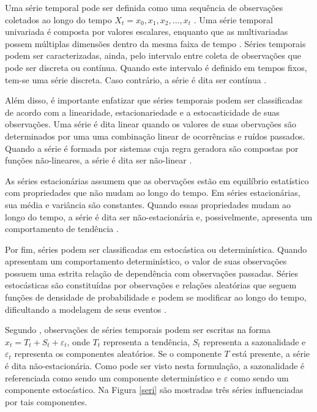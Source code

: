 Uma série temporal pode ser definida como uma sequência de observações coletados ao longo do tempo $X_{t}={x_{0},x_{1},x_{2},...,x_{t}}$ \cite{box2015,Chouakria2007,morettin2006}. Uma série temporal univariada é composta por valores escalares, enquanto que as multivariadas possem múltiplas dimensões dentro da mesma faixa de tempo \cite{box2015,Chouakria2007}. Séries temporais podem ser caracterizadas, ainda, pelo intervalo entre coleta de observações que pode ser discreta ou contínua. Quando este intervalo é definido em tempos fixos, tem-se uma série discreta. Caso contrário, a série é dita ser contínua \cite{box2015, morettin2006}.  

Além disso, é importante enfatizar que séries temporais podem ser classificadas de acordo com a linearidade, estacionariedade e a estocasticidade de suas observações. Uma  série é dita linear quando os valores de suas obervações são determinados por uma uma combinação linear de ocorrências e ruídos passados. Quando a série é formada por sistemas cuja regra geradora são compostas por funções não-lineares, a série é dita ser não-linear \cite{box2015}.

As séries estacionárias assumem que as obervações estão em equilíbrio estatístico com propriedades que não mudam ao longo do tempo. Em séries estacionárias, sua média e variância são constantes. Quando essas propriedades mudam ao longo do tempo, a série é dita ser não-estacionária e, possivelmente, apresenta um comportamento de tendência   \cite{box2015,cryer2008}.

Por fim, séries podem ser classificadas em estocástica ou determinística. Quando apresentam um comportamento determinístico, o valor de suas observações possuem uma estrita relação de dependência com observações passadas. Séries estocásticas são constituídas por observações e relações aleatórias que seguem funções de densidade de probabilidade e podem se modificar ao longo do tempo, dificultando a modelagem de seus eventos \cite{box2015, morettin2006}.

Segundo , observações de séries temporais podem ser escritas na forma $x_{t}=T_{t}+S_{t}+ \varepsilon_{t}$, onde $T_{t}$ representa a tendência, $S_{t}$ representa a sazonalidade e $\varepsilon_{t} $ representa os componentes aleatórios. Se o componente $T$ está presente, a série é dita não-estacionária. Como pode ser visto nesta formulação, a sazonalidade é referenciada como sendo um componente determinístico e $\varepsilon$ como sendo um componente estocástico. Na Figura \ref{seri} são mostradas três séries influenciadas por tais componentes. 

